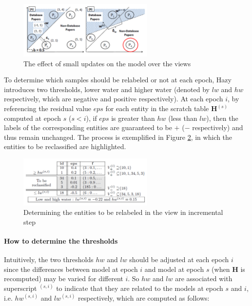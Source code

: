 \begin{figure}
    \centering
    \includegraphics[height = 0.3\textwidth, width=0.6\textwidth]{Figures/Hazy_view_update.png}
    \caption{The effect of small updates on the model over the views}
    \label{fig:Hazy_view_update}
\end{figure}


To determine which samples should be relabeled or not at each epoch, Hazy introduces two thresholds, lower water and higher water (denoted by $lw$ and $hw$ respectively, which are negative and positive respectively). At each epoch $i$, by referencing the residual value $eps$ for each entity in the scratch table $\textbf{H}^{(s)}$ computed at epoch $s$ ($s<i$), if $eps$ is greater than $hw$ (less than $lw$), then the labels of the corresponding entities are guaranteed to be $+$ ($-$ respectively) and thus remain unchanged. The process is exemplified in Figure \ref{fig:Hazy_threshold}, in which the entities to be reclassified are highlighted.


\begin{figure}
    \centering
    \includegraphics[height = 0.3\textwidth, width=0.6\textwidth]{Figures/Hazy_threshold.png}
    \caption{Determining the entities to be relabeled in the view in incremental step}
    \label{fig:Hazy_threshold}
\end{figure}

\paragraph{How to determine the thresholds}
Intuitively, the two thresholds $hw$ and $lw$ should be adjusted at each epoch $i$ since the differences between model at epoch $i$ and model at epoch $s$ (when $\textbf{H}$ is recomputed) may be varied for different $i$. So $hw$ and $lw$ are associated with superscript $^{(s,i)}$ to indicate that they are related to the models at epoch $s$ and $i$, i.e. $hw^{(s,i)}$ and $lw^{(s,i)}$ respectively, which are computed as follows:

